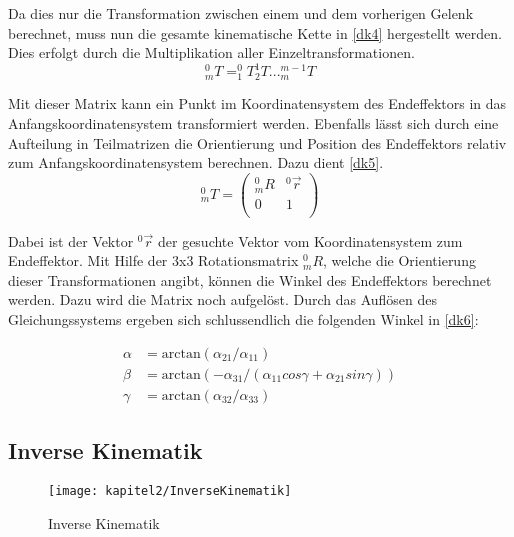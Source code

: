 Da dies nur die Transformation zwischen einem und dem vorherigen Gelenk berechnet, muss nun die gesamte kinematische Kette in \autoref{dk4} hergestellt werden. Dies erfolgt durch die Multiplikation aller Einzeltransformationen.
\begin{equation}
  _{m}^{0}T = ^{0}_{1}T^{1}_{2}T...^{m-1}_{m}T
\label{dk4}
\end{equation}

Mit dieser Matrix kann ein Punkt im Koordinatensystem des Endeffektors in das Anfangskoordinatensystem transformiert werden. Ebenfalls lässt sich durch eine Aufteilung in Teilmatrizen die Orientierung und Position des Endeffektors relativ zum Anfangskoordinatensystem berechnen. Dazu dient \autoref{dk5}.
\begin{equation}
  _{m}^{0}T = \begin{pmatrix}
    _{m}^{0}R & ^{0}\vec{r}\\
    0 & 1\\
  \end{pmatrix}
\label{dk5}
\end{equation}

Dabei ist der Vektor $^{0}\vec{r}$ der gesuchte Vektor vom Koordinatensystem zum Endeffektor. Mit Hilfe der 3x3 Rotationsmatrix $_{m}^{0}R$, welche die Orientierung dieser Transformationen angibt, können die Winkel des Endeffektors berechnet werden. Dazu wird die Matrix noch aufgelöst. Durch das Auflösen des Gleichungssystems ergeben sich schlussendlich die folgenden Winkel in \autoref{dk6}:

\begin{equation}
  \begin{aligned}
    \alpha & = \textrm{arctan}(\alpha_{21} / \alpha_{11}) \\
    \beta & = \textrm{arctan}(-\alpha_{31} / (\alpha_{11} cos \gamma + \alpha_{21} sin \gamma)) \\
    \gamma & = \textrm{arctan}(\alpha_{32} / \alpha_{33})
  \end{aligned}
\label{dk6}
\end{equation}

\subsection{Inverse Kinematik}

\begin{figure}[b!]
  \centering
  \texttt{[image: kapitel2/InverseKinematik]}
  \caption{Inverse Kinematik}
  \label{Kap2:inversekinematik}
\end{figure}

